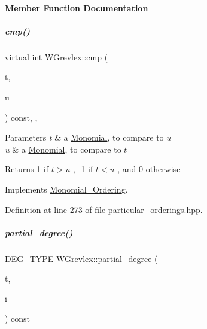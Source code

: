 \paragraph{Member Function Documentation}
\mbox{\label{group__orderinggroup_a0a65b26c9057d7f9d8c29ca3896cfd74}} 
\subparagraph{\texorpdfstring{cmp()}{cmp()}}
{\footnotesize\ttfamily virtual int W\+Grevlex\+::cmp (\begin{DoxyParamCaption}\item[{const \hyperlink{group__polygroup_class_monomial}{Monomial} \&}]{t,  }\item[{const \hyperlink{group__polygroup_class_monomial}{Monomial} \&}]{u }\end{DoxyParamCaption}) const\hspace{0.3cm}{\ttfamily [inline]}, {\ttfamily [override]}, {\ttfamily [virtual]}}


\begin{DoxyParams}{Parameters}
{\em t} & a \hyperlink{group__polygroup_class_monomial}{Monomial}, to compare to $ u $ \\
\hline
{\em u} & a \hyperlink{group__polygroup_class_monomial}{Monomial}, to compare to $ t $ \\
\hline
\end{DoxyParams}
\begin{DoxyReturn}{Returns}
1 if $ t > u $ , -\/1 if $ t < u $ , and 0 otherwise 
\end{DoxyReturn}


Implements \hyperlink{group__orderinggroup_a9bc3155fc98b4d40c26118fa2114b827}{Monomial\+\_\+\+Ordering}.



Definition at line 273 of file particular\+\_\+orderings.\+hpp.

\mbox{\label{group__orderinggroup_ad7e630709c14774bac365c46b9455bab}} 
\subparagraph{\texorpdfstring{partial\+\_\+degree()}{partial\_degree()}}
{\footnotesize\ttfamily D\+E\+G\+\_\+\+T\+Y\+PE W\+Grevlex\+::partial\+\_\+degree (\begin{DoxyParamCaption}\item[{const \hyperlink{group__polygroup_class_monomial}{Monomial} \&}]{t,  }\item[{N\+V\+A\+R\+\_\+\+T\+Y\+PE}]{i }\end{DoxyParamCaption}) const}

